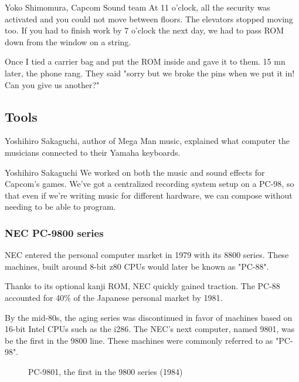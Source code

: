 \begin{q}{Yoko Shimomura, Capcom Sound team\cite{sf2musicsecurity}}
At 11 o'clock, all the security was activated and you could not move between floors. The elevators stopped moving too. If you had to finish work by 7 o'clock the next day, we had to pass ROM down from the window on a string.

Once I tied a carrier bag and put the ROM inside and gave it to them. 15 mn later, the phone rang. They said "sorry but we broke the pins when we put it in! Can you give us another?"
\end{q}



\subsection{Tools}
Yoshihiro Sakaguchi, author of Mega Man music, explained what computer the musicians connected to their Yamaha keyboards.

\begin{q}{Yoshihiro Sakaguchi\cite{yoko_shimomura_interview}  }
We worked on both the music and sound effects for Capcom’s games. We’ve got a centralized recording system setup on a PC-98, so that even if we’re writing music for different hardware, we can compose without needing to be able to program.
\end{q}

\subsubsection{NEC PC-9800 series}

NEC entered the personal computer market in 1979 with its 8800 series. These machines, built around 8-bit z80 CPUs would later be known as "PC-88". 

Thanks to its optional kanji ROM, NEC quickly gained traction. The PC-88 accounted for 40\% of the Japanese personal market by 1981.

By the mid-80s, the aging series was discontinued in favor of machines based on 16-bit Intel CPUs such as the i286. The NEC's next computer, named 9801, was be the first in the 9800 line. These machines were commonly referred to as "PC-98".

\begin{figure}[H]

\caption*{PC-9801, the first in the 9800 series (1984)}
\end{figure}

